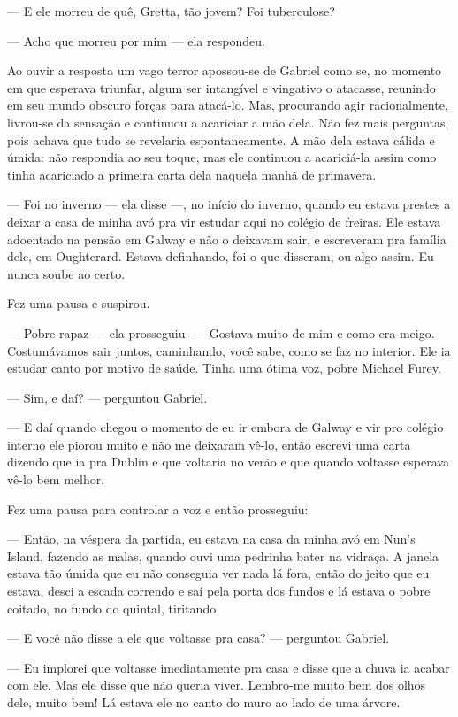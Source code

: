 --- E ele morreu de quê, Gretta, tão jovem?  Foi tuberculose?

--- Acho que morreu por mim --- ela respondeu.

Ao ouvir a resposta um vago terror apossou-se de Gabriel como se, no momento em
que esperava triunfar, algum ser intangível e vingativo o atacasse, reunindo em
seu mundo obscuro forças para atacá-lo.  Mas, procurando agir racionalmente,
livrou-se da sensação e continuou a acariciar a mão dela.  Não fez mais
perguntas, pois achava que tudo se revelaria espontaneamente.  A mão dela
estava cálida e úmida: não respondia ao seu toque, mas ele continuou a
acariciá-la assim como tinha acariciado a primeira carta dela naquela manhã de
primavera.

--- Foi no inverno --- ela disse ---, no início do inverno, quando eu estava
prestes a deixar a casa de minha avó pra vir estudar aqui no colégio de
freiras.  Ele estava adoentado na pensão em Galway e não o deixavam sair, e
escreveram pra  família dele, em Oughterard.  Estava definhando, foi o que
disseram, ou algo assim.  Eu nunca soube ao certo.

Fez uma pausa e suspirou.

--- Pobre rapaz --- ela prosseguiu.  --- Gostava muito de mim e como era meigo.
Costumávamos sair juntos, caminhando, você sabe, como se faz no interior.  Ele
ia estudar canto por motivo de saúde.  Tinha uma ótima voz, pobre Michael
Furey.

--- Sim, e daí? --- perguntou Gabriel.

--- E daí quando chegou o momento de eu ir embora de Galway e vir pro colégio
interno ele piorou muito e não me deixaram vê-lo, então escrevi uma carta
dizendo que ia pra Dublin e que voltaria no verão e que quando voltasse
esperava vê-lo bem melhor.

Fez uma pausa para controlar a voz e então prosseguiu:

--- Então, na véspera da partida, eu estava na casa da minha avó em Nun’s
Island, fazendo as malas, quando ouvi uma pedrinha bater na vidraça.  A janela
estava tão úmida que eu não conseguia ver nada lá fora, então do jeito que eu
estava, desci a escada correndo e saí pela porta dos fundos e lá estava o pobre
coitado, no fundo do quintal, tiritando.

--- E você não disse a ele que voltasse pra casa? --- perguntou Gabriel.

--- Eu implorei que voltasse imediatamente pra casa e disse que a chuva ia
acabar com ele.  Mas ele disse que não queria viver.  Lembro-me muito bem dos
olhos dele, muito bem!  Lá estava ele no canto do muro ao lado de uma árvore.


